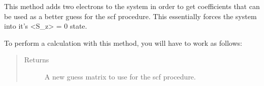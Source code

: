 \documentclass[letterpaper,10pt,english]{sphinxmanual}
\begin{document}
\begin{fulllineitems}
\begin{fulllineitems}
\end{fulllineitems}


\begin{fulllineitems}
\label{\detokenize{UHF:ghf.UHF.UHF.extra_electron_guess}}
This method adds two electrons to the system in order to get coefficients that can be used as a better guess
for the scf procedure. This essentially forces the system into it’s \textless{}S\_z\textgreater{} = 0 state.

To perform a calculation with this method, you will have to work as follows:

\begin{sphinxVerbatim}[commandchars=\\\{\}]
           
   
  
\end{sphinxVerbatim}
\begin{quote}\begin{description}
\item[{Returns}] \leavevmode
A new guess matrix to use for the scf procedure.

\end{description}\end{quote}

\end{fulllineitems}


\end{fulllineitems}
\end{document}
